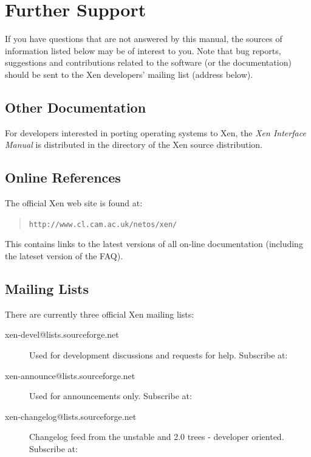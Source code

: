 \documentclass[11pt,twoside,final,openright]{report}
\begin{document}
{\chapter{Further Support}

If you have questions that are not answered by this manual, the
sources of information listed below may be of interest to you.  Note
that bug reports, suggestions and contributions related to the
software (or the documentation) should be sent to the Xen developers'
mailing list (address below).

\section{Other Documentation}

For developers interested in porting operating systems to Xen, the
{\em Xen Interface Manual} is distributed in the 
directory of the Xen source distribution.  


\section{Online References}

The official Xen web site is found at:
\begin{quote}
{\tt http://www.cl.cam.ac.uk/netos/xen/}
\end{quote}

This contains links to the latest versions of all on-line 
documentation (including the lateset version of the FAQ). 

\section{Mailing Lists}

There are currently three official Xen mailing lists:

\begin{description}
\item[xen-devel@lists.sourceforge.net] Used for development
discussions and requests for help.  Subscribe at: \\
\item[xen-announce@lists.sourceforge.net] Used for announcements only.
Subscribe at: \\
\item[xen-changelog@lists.sourceforge.net]  Changelog feed
from the unstable and 2.0 trees - developer oriented.  Subscribe at: \\
\end{description}

}
\end{document}
